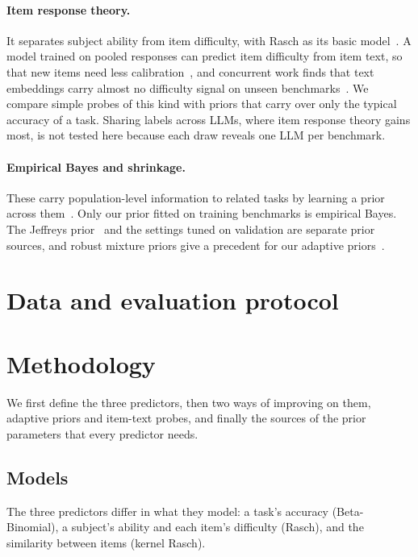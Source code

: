 \documentclass{article}
\begin{document}
\paragraph{Item response theory.} It separates subject ability from item difficulty, with Rasch as its basic model~\citep{rasch1960}. A model trained on pooled responses can predict item difficulty from item text, so that new items need less calibration~\citep{truong2025amortized}, and concurrent work finds that text embeddings carry almost no difficulty signal on unseen benchmarks~\citep{krsteski2026difficulty}. We compare simple probes of this kind with priors that carry over only the typical accuracy of a task. Sharing labels across LLMs, where item response theory gains most, is not tested here because each draw reveals one LLM per benchmark.

\paragraph{Empirical Bayes and shrinkage.} These carry population-level information to related tasks by learning a prior across them~\citep{robbins1956,efron1973,rao2015}. Only our prior fitted on training benchmarks is empirical Bayes. The Jeffreys prior~\citep{jeffreys1946} and the settings tuned on validation are separate prior sources, and robust mixture priors give a precedent for our adaptive priors~\citep{schmidli2014robust}.

\section{Data and evaluation protocol}\label{sec:setting}


\section{Methodology}\label{sec:models}
We first define the three predictors, then two ways of improving on them, adaptive priors and item-text probes, and finally the sources of the prior parameters that every predictor needs.

\subsection{Models}
The three predictors differ in what they model: a task's accuracy (Beta-Binomial), a subject's ability and each item's difficulty (Rasch), and the similarity between items (kernel Rasch).
\end{document}
